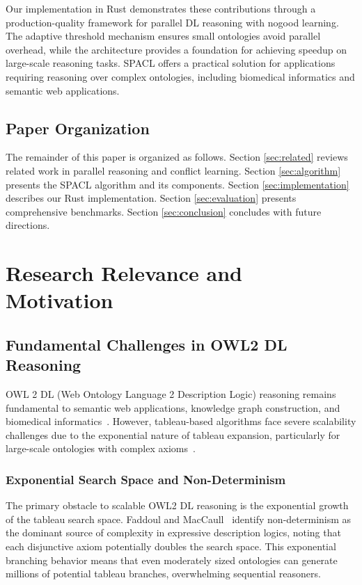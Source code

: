 \documentclass[preprint,12pt]{elsarticle}
\begin{document}
Our implementation in Rust demonstrates these contributions through a production-quality framework for parallel DL reasoning with nogood learning. The adaptive threshold mechanism ensures small ontologies avoid parallel overhead, while the architecture provides a foundation for achieving speedup on large-scale reasoning tasks. SPACL offers a practical solution for applications requiring reasoning over complex ontologies, including biomedical informatics and semantic web applications.

\subsection{Paper Organization}
\label{sec:organization}

The remainder of this paper is organized as follows. Section \ref{sec:related} reviews related work in parallel reasoning and conflict learning. Section \ref{sec:algorithm} presents the SPACL algorithm and its components. Section \ref{sec:implementation} describes our Rust implementation. Section \ref{sec:evaluation} presents comprehensive benchmarks. Section \ref{sec:conclusion} concludes with future directions.

\section{Research Relevance and Motivation}

\subsection{Fundamental Challenges in OWL2 DL Reasoning}

OWL 2 DL (Web Ontology Language 2 Description Logic) reasoning remains fundamental to semantic web applications, knowledge graph construction, and biomedical informatics~\cite{hitzler2012owl}. However, tableau-based algorithms face severe scalability challenges due to the exponential nature of tableau expansion, particularly for large-scale ontologies with complex axioms~\cite{amir2017cedar}.

\subsubsection{Exponential Search Space and Non-Determinism}

The primary obstacle to scalable OWL2 DL reasoning is the exponential growth of the tableau search space. Faddoul and MacCaull~\cite{faddoul2015fork} identify non-determinism as the dominant source of complexity in expressive description logics, noting that each disjunctive axiom potentially doubles the search space. This exponential branching behavior means that even moderately sized ontologies can generate millions of potential tableau branches, overwhelming sequential reasoners.
\end{document}
